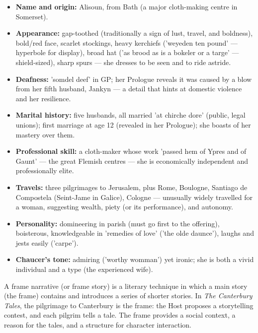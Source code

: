 \documentclass[11pt]{article}
\newcommand{\cle}[1]{{\popxbold\color{popdark}#1}}
\begin{document}
\begin{aretenir}
\begin{itemize}
\item \textbf{Name and origin:} Alisoun, from Bath (a major cloth-making centre in Somerset).
\item \textbf{Appearance:} gap-toothed (traditionally a sign of lust, travel, and boldness), bold/red face, scarlet stockings, heavy kerchiefs ('weyeden ten pound' — hyperbole for display), broad hat ('as brood as is a bokeler or a targe' — shield-sized), sharp spurs — she dresses to be seen and to ride astride.
\item \textbf{Deafness:} 'somdel deef' in GP; her Prologue reveals it was caused by a blow from her fifth husband, Jankyn — a detail that hints at domestic violence and her resilience.
\item \textbf{Marital history:} five husbands, all married 'at chirche dore' (public, legal unions); first marriage at age 12 (revealed in her Prologue); she boasts of her mastery over them.
\item \textbf{Professional skill:} a cloth-maker whose work 'passed hem of Ypres and of Gaunt' — the great Flemish centres — she is economically independent and professionally elite.
\item \textbf{Travels:} three pilgrimages to Jerusalem, plus Rome, Boulogne, Santiago de Compostela (Seint-Jame in Galice), Cologne — unusually widely travelled for a woman, suggesting wealth, piety (or its performance), and autonomy.
\item \textbf{Personality:} domineering in parish (must go first to the offering), boisterous, knowledgeable in 'remedies of love' ('the olde daunce'), laughs and jests easily ('carpe').
\item \textbf{Chaucer's tone:} admiring ('worthy womman') yet ironic; she is both a vivid individual and a type (the experienced wife).
\end{itemize}
\end{aretenir}

\begin{definition}
A \cle{frame narrative} (or frame story) is a literary technique in which a main story (the frame) contains and introduces a series of shorter stories. In \emph{The Canterbury Tales}, the pilgrimage to Canterbury is the frame: the Host proposes a storytelling contest, and each pilgrim tells a tale. The frame provides a social context, a reason for the tales, and a structure for character interaction.
\end{definition}
\end{document}
